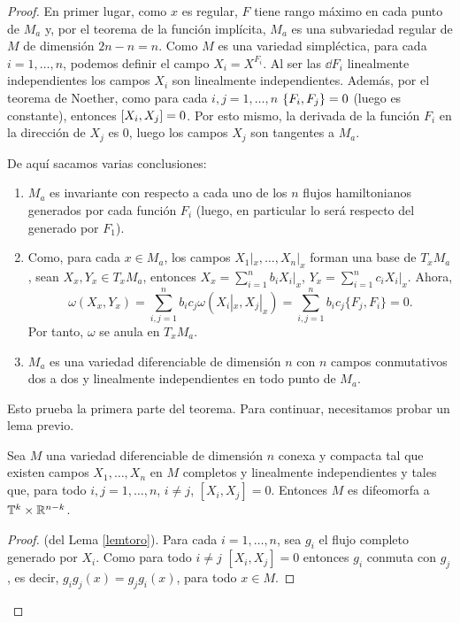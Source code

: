  \begin{proof}
  En primer lugar, como $x$ es regular, $F$ tiene rango máximo en cada punto de $M_a$ y, por el teorema de la función implícita, $M_a$ es una subvariedad regular de $M$ de dimensión $2n-n=n$. 
  Como $M$ es una variedad simpléctica, para cada $i=1,\dots,n$, podemos definir el campo $X_i=X^{F_i}$. Al ser las $\dd F_i$ linealmente independientes los campos $X_i$ son linealmente independientes. Además, por el teorema de Noether, como para cada $i,j= 1,\dots,n$ $\left\lbrace F_i,F_j\right\rbrace=0$ (luego es constante), entonces $\left[X_i,X_j\right]=0$. Por esto mismo, la derivada de la función $F_i$ en la dirección de $X_j$ es 0, luego los campos $X_j$ son tangentes a $M_a$.

  De aquí sacamos varias conclusiones:
  \begin{enumerate}
    \item $M_a$ es invariante con respecto a cada uno de los $n$ flujos hamiltonianos generados por cada función $F_i$ (luego, en particular lo será respecto del generado por $F_1$).
    \item Como, para cada $x \in M_a$, los campos $X_1|_x,\dots, X_n|_x$ forman una base de $T_x M_a$, sean $X_x, Y_x \in T_x M_a$, entonces $X_x = \sum_{i=1}^n b_i X_i|_x$, $Y_x=\sum_{i=1}^n c_i X_i|_x$. Ahora,
      \[
	\omega(X_x,Y_x)= \sum_{i,j=1}^n b_i c_j \omega(X_i|_x,X_j|_x) = \sum_{i,j=1}^n b_i c_j \{F_j,F_i\} = 0.
      \]
      Por tanto, $\omega$ se anula en $T_x M_a$. 
    \item $M_a$ es una variedad diferenciable de dimensión $n$ con $n$ campos conmutativos dos a dos y linealmente independientes en todo punto de $M_a$. 
  \end{enumerate}

  Esto prueba la primera parte del teorema. Para continuar, necesitamos probar un lema previo.

  \begin{lema}\label{lemtoro}
    Sea $M$ una variedad diferenciable de dimensión $n$ conexa y compacta tal que existen campos $X_1,\dots,X_n$ en $M$ completos y linealmente independientes y tales que, para todo $i,j=1,\dots,n$, $i\neq j$, $[X_i,X_j]=0$. Entonces $M$ es difeomorfa a $\mathbb{T}^k\times \mathbb{R}^{n-k}$. 
\end{lema}
\begin{proof}(del Lema \ref{lemtoro}).
  Para cada $i=1,\dots,n$, sea $g_i$ el flujo completo generado por $X_i$. Como para todo $i\neq j$ $[X_i,X_j]=0 $ entonces $g_i$ conmuta con $g_j$, es decir, $g_ig_j (x)=g_jg_i (x)$, para todo $x \in M$. 


\end{proof}
\end{proof}
